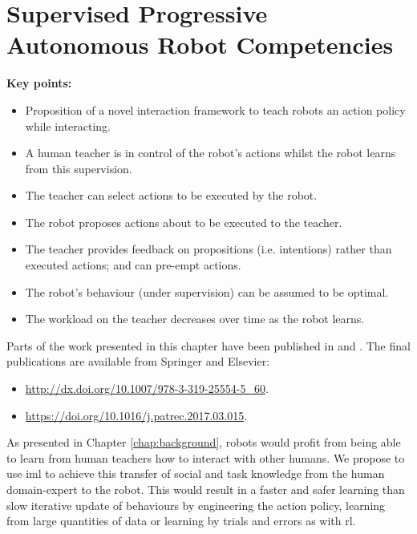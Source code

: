 \chapter{Supervised Progressive Autonomous Robot \newline Competencies}\label{chap:sparc}
\glsresetall
\graphicspath{{images/sparc/}}

\begin{framed}
	\textbf{Key points:}
	\begin{itemize}
		\item Proposition of a novel interaction framework to teach robots an action policy while interacting.
		\item A human teacher is in control of the robot's actions whilst the robot learns from this supervision.
		\item The teacher can select actions to be executed by the robot.
		\item The robot proposes actions about to be executed to the teacher.
		\item The teacher provides feedback on propositions (i.e. intentions) rather than executed actions; and can pre-empt actions.
		\item The robot's behaviour (under supervision) can be assumed to be optimal.
		\item The workload on the teacher decreases over time as the robot learns.
	\end{itemize}
\end{framed}

Parts of the work presented in this chapter have been published in \cite{senft2015sparc} and \cite{senft2017supervised}. The final publications are available from Springer and Elsevier:
\begin{itemize}
	\item \url{http://dx.doi.org/10.1007/978-3-319-25554-5_60}.
	\item \url{https://doi.org/10.1016/j.patrec.2017.03.015}.
\end{itemize}

\newpage
{}
As presented in Chapter \ref{chap:background}, robots would profit from being able to learn from human teachers how to interact with other humans. We propose to use \gls{iml} to achieve this transfer of social and task knowledge from the human domain-expert to the robot. This would result in a faster and safer learning than slow iterative update of behaviours by engineering the action policy, learning from large quantities of data or learning by trials and errors as with \gls{rl}.

